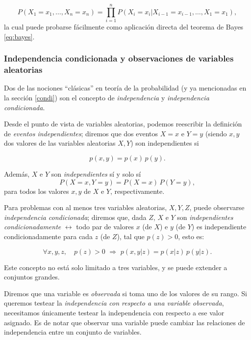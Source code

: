 $$P(X_1=x_1, \dots, X_n=x_n) = \prod_{i=1}^n P(X_i=x_i|X_{i-1}=x_{i-1}, \dots, X_1=x_1),$$ la cual puede 
probarse fácilmente como aplicación directa del teorema de Bayes \ref{eq:bayes}.

\subsubsection{Independencia condicionada y observaciones de variables aleatorias}

Dos de las nociones ``clásicas'' en teoría de la probabilidad (y ya mencionadas en la sección \ref{condi}) son 
el concepto de {\em independencia} y {\em independencia condicionada}. 

Desde el punto de vista de variables aleatorias, podemos reescribir la definición de {\em eventos independientes}; 
diremos que dos eventos $X=x$ e $Y=y$ (siendo $x,y$ dos valores de las variables aleatorias $X,Y$) son 
independientes si 

$$p(x,y) = p(x) \, p(y).$$

Además, $X$ e $Y$ son {\em independientes} sí y solo sí $$P(X=x, Y=y) = P(X=x) \, P(Y=y),$$ 
para todos los valores $x,y$ de $X$ e $Y$, respectivamente.

Para problemas con al menos tres variables aleatorias, $X,Y,Z$, puede observarse {\em independencia 
condicionada}; diremos que, dada $Z$, $X$ e $Y$ son {\em independientes condicionadamente } $\leftrightarrow$ todo par 
de valores $x$ (de $X$) e $y$ (de $Y$) es independiente condicionadamente para cada $z$ (de $Z$), tal que 
$p(z) > 0$, esto es:

$$\forall x, y, z, \quad p(z) > 0 \,\, \Rightarrow \,\, p(x,y|z) = p(x|z)\, p(y|z).$$

Este concepto no está solo limitado a tres variables, y se puede extender a conjuntos grandes.

Diremos que una variable es {\em observada} si toma uno de los valores de su rango. Si queremos testear la {\em 
independencia con respecto a una variable observada}, necesitamos únicamente testear la independencia con respecto 
a ese valor asignado. Es de notar que observar una variable puede cambiar las relaciones de independencia entre
un conjunto de variables.

